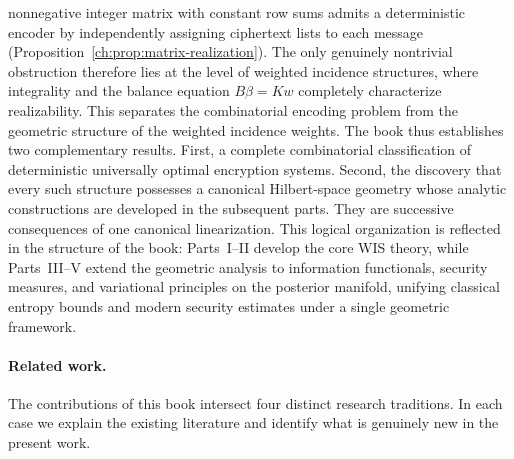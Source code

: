nonnegative integer matrix with constant row sums admits a deterministic
encoder by independently assigning ciphertext lists to each message
(Proposition~\ref{ch:prop:matrix-realization}).  The only genuinely
nontrivial obstruction therefore lies at the level of weighted incidence
structures, where integrality and the balance equation $B\beta=Kw$
completely characterize realizability.  This separates the combinatorial
encoding problem from the geometric structure of the weighted incidence
weights.
The book thus establishes two complementary results.  First, a
complete combinatorial classification of deterministic universally
optimal encryption systems.  Second, the discovery that every such
structure possesses a canonical Hilbert-space geometry whose analytic
constructions are developed in the subsequent parts.  They are
successive consequences of one canonical linearization.
This logical organization is reflected in the structure of the book:
Parts~I--II develop the core WIS theory, while Parts~III--V extend the
geometric analysis to information functionals, security measures, and
variational principles on the posterior manifold, unifying classical
entropy bounds and modern security estimates under a single geometric
framework.
\paragraph{Related work.}
The contributions of this book intersect four distinct research
traditions.  In each case we explain the existing literature and
identify what is genuinely new in the present work.
